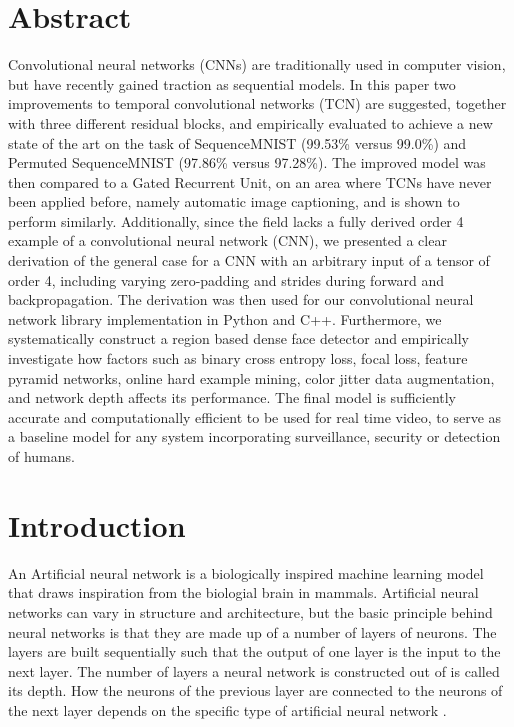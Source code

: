 \documentclass[a4paper, twoside]{article}
\begin{document}
\newpage

\section*{Abstract}
\normalsize{}
Convolutional neural networks (CNNs) are traditionally used in computer vision, but have recently gained traction as sequential models. In this paper two improvements to temporal convolutional networks (TCN) are suggested, together with three different residual blocks, and empirically evaluated to achieve a new state of the art on the task of SequenceMNIST (99.53\% versus 99.0\%) and Permuted SequenceMNIST (97.86\% versus 97.28\%). The improved model was then compared to a Gated Recurrent Unit, on an area where TCNs have never been applied before, namely automatic image captioning, and is shown to perform similarly. Additionally, since the field lacks a fully derived order 4 example of a convolutional neural network (CNN), we presented a clear derivation of the general case for a CNN with an arbitrary input of a tensor of order 4, including varying zero-padding and strides during forward and backpropagation. The derivation was then used for our convolutional neural network library implementation in Python and C++. Furthermore, we systematically construct a region based dense face detector and empirically investigate how factors such as binary cross entropy loss, focal loss, feature pyramid networks, online hard example mining, color jitter data augmentation, and network depth affects its performance. The final model is sufficiently accurate and computationally efficient to be used for real time video, to serve as a baseline model for any system incorporating surveillance, security or detection of humans.
\thispagestyle{empty}
\newpage

\tableofcontents
\newpage
\section{Introduction}

An Artificial neural network is a biologically inspired machine learning model that draws inspiration from the biologial brain in mammals. Artificial neural networks can vary in structure and architecture, but the basic principle behind neural networks is that they are made up of a number of layers of neurons. The layers are built sequentially such that the output of one layer is the input to the next layer. The number of layers a neural network is constructed out of is called its depth. How the neurons of the previous layer are connected to the neurons of the next layer depends on the specific type of artificial neural network \cite{cs231n}.
\end{document}
